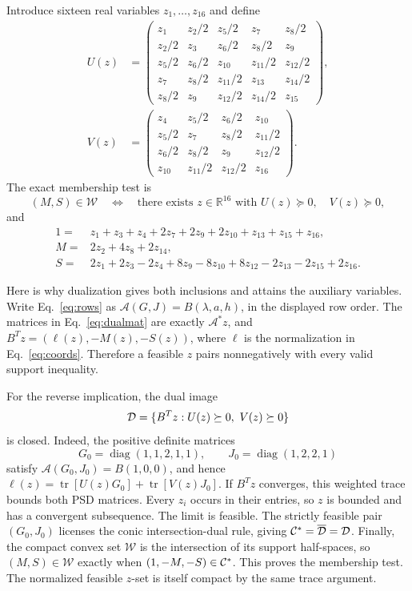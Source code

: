 \documentclass[11pt]{article}
\newcommand{\W}{\mathcal W}
\newcommand{\tr}{\operatorname{tr}}
\begin{document}
Introduce sixteen real variables \(z_1,\ldots,z_{16}\) and define
\begin{equation}
\begin{split}
 U(z)&=
 \begin{pmatrix}
 z_1&z_2/2&z_5/2&z_7&z_8/2\\
 z_2/2&z_3&z_6/2&z_8/2&z_9\\
 z_5/2&z_6/2&z_{10}&z_{11}/2&z_{12}/2\\
 z_7&z_8/2&z_{11}/2&z_{13}&z_{14}/2\\
 z_8/2&z_9&z_{12}/2&z_{14}/2&z_{15}
 \end{pmatrix},\\[2pt]
 V(z)&=
 \begin{pmatrix}
 z_4&z_5/2&z_6/2&z_{10}\\
 z_5/2&z_7&z_8/2&z_{11}/2\\
 z_6/2&z_8/2&z_9&z_{12}/2\\
 z_{10}&z_{11}/2&z_{12}/2&z_{16}
 \end{pmatrix}.
\end{split}\label{eq:dualmat}
\end{equation}
The exact membership test is
\[
 (M,S)\in\W\quad\Longleftrightarrow\quad
 \text{there exists }z\in\mathbb R^{16}
 \text{ with }U(z)\succeq0,\quad V(z)\succeq0,
\]
and
\begin{align}
 1={}&z_1+z_3+z_4+2z_7+2z_9+2z_{10}+z_{13}+z_{15}+z_{16},\nonumber\\
 M={}&2z_2+4z_8+2z_{14},\nonumber\\
 S={}&2z_1+2z_3-2z_4+8z_9-8z_{10}+8z_{12}
       -2z_{13}-2z_{15}+2z_{16}.
 \label{eq:coords}
\end{align}

Here is why dualization gives both inclusions and attains the auxiliary variables.
Write Eq.~\eqref{eq:rows} as
\(\mathcal A(G,J)=B(\lambda,a,h)\), in the displayed row order.
The matrices in Eq.~\eqref{eq:dualmat} are exactly
\(\mathcal A^*z\), and
\(B^Tz=(\ell(z),-M(z),-S(z))\), where \(\ell\) is the normalization in
Eq.~\eqref{eq:coords}. Therefore a feasible \(z\) pairs nonnegatively with every
valid support inequality.

For the reverse implication, the dual image
\[
 {\cal D}=\{B^Tz:U(z)\succeq0,\ V(z)\succeq0\}
\]
is closed. Indeed, the positive definite matrices
\[
 G_0=\operatorname{diag}(1,1,2,1,1),\qquad
 J_0=\operatorname{diag}(1,2,2,1)
\]
satisfy \(\mathcal A(G_0,J_0)=B(1,0,0)\), and hence
\(\ell(z)=\tr[U(z)G_0]+\tr[V(z)J_0]\).
If \(B^Tz\) converges, this weighted trace bounds both PSD matrices.
Every \(z_i\) occurs in their entries, so \(z\) is bounded and has a convergent
subsequence. The limit is feasible. The strictly feasible pair \((G_0,J_0)\)
licenses the conic intersection-dual rule, giving
\({\cal C}^*=\overline{\cal D}={\cal D}\).
Finally, the compact convex set \(\W\) is the intersection of its support
half-spaces, so \((M,S)\in\W\) exactly when \((1,-M,-S)\in{\cal C}^*\).
This proves the membership test. The normalized feasible \(z\)-set is itself
compact by the same trace argument.
\end{document}

